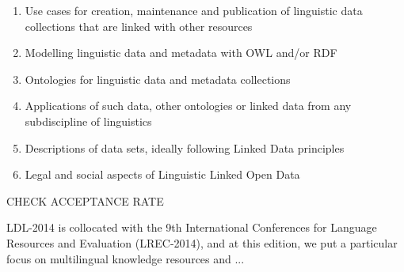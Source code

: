\begin{enumerate}
\item Use cases %
for creation, maintenance and publication of linguistic data collections that are linked with other resources

\item Modelling linguistic data and metadata with OWL and/or RDF

\item Ontologies for linguistic data and metadata collections

\item Applications of such data, other ontologies or linked data from any subdiscipline of linguistics %

\item Descriptions of data sets, ideally following Linked Data principles

\item Legal and social aspects of Linguistic Linked Open Data
\end{enumerate}

CHECK ACCEPTANCE RATE

\smallskip

LDL-2014 is collocated with the 9th International Conferences for Language Resources and Evaluation (LREC-2014), and at this edition, we put a particular focus on multilingual knowledge resources and ...



